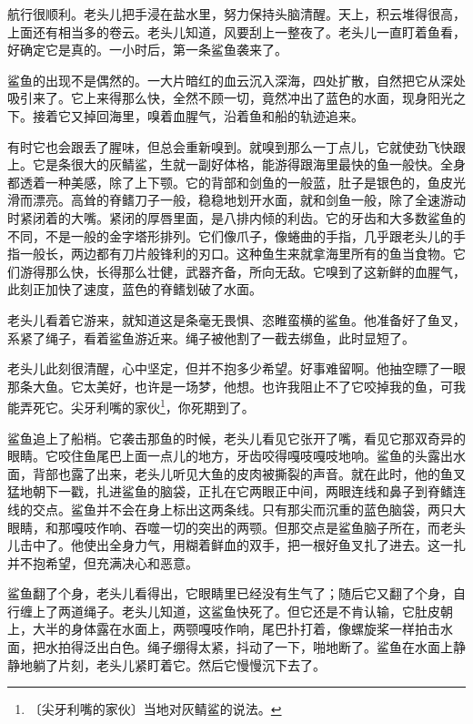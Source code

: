 \documentclass[12pt,UTF-8,openany]{ctexbook}
\begin{document}
\begin{large}
    
    航行很顺利。老头儿把手浸在盐水里，努力保持头脑清醒。天上，积云堆得很高，上面还有相当多的卷云。老头儿知道，风要刮上一整夜了。老头儿一直盯着鱼看，好确定它是真的。一小时后，第一条鲨鱼袭来了。
    
    鲨鱼的出现不是偶然的。一大片暗红的血云沉入深海，四处扩散，自然把它从深处吸引来了。它上来得那么快，全然不顾一切，竟然冲出了蓝色的水面，现身阳光之下。接着它又掉回海里，嗅着血腥气，沿着鱼和船的轨迹追来。
    
    有时它也会跟丢了腥味，但总会重新嗅到。就嗅到那么一丁点儿，它就使劲飞快跟上。它是条很大的灰鲭鲨，生就一副好体格，能游得跟海里最快的鱼一般快。全身都透着一种美感，除了上下颚。它的背部和剑鱼的一般蓝，肚子是银色的，鱼皮光滑而漂亮。高耸的脊鳍刀子一般，稳稳地划开水面，就和剑鱼一般，除了全速游动时紧闭着的大嘴。紧闭的厚唇里面，是八排内倾的利齿。它的牙齿和大多数鲨鱼的不同，不是一般的金字塔形排列。它们像爪子，像蜷曲的手指，几乎跟老头儿的手指一般长，两边都有刀片般锋利的刃口。这种鱼生来就拿海里所有的鱼当食物。它们游得那么快，长得那么壮健，武器齐备，所向无敌。它嗅到了这新鲜的血腥气，此刻正加快了速度，蓝色的脊鳍划破了水面。
    
    老头儿看着它游来，就知道这是条毫无畏惧、恣睢蛮横的鲨鱼。他准备好了鱼叉，系紧了绳子，看着鲨鱼游近来。绳子被他割了一截去绑鱼，此时显短了。
    
    老头儿此刻很清醒，心中坚定，但并不抱多少希望。好事难留啊。他抽空瞟了一眼那条大鱼。它太美好，也许是一场梦，他想。也许我阻止不了它咬掉我的鱼，可我能弄死它。尖牙利嘴的家伙\footnote{〔尖牙利嘴的家伙〕当地对灰鲭鲨的说法。}，你死期到了。
    
    鲨鱼追上了船梢。它袭击那鱼的时候，老头儿看见它张开了嘴，看见它那双奇异的眼睛。它咬住鱼尾巴上面一点儿的地方，牙齿咬得嘎吱嘎吱地响。鲨鱼的头露出水面，背部也露了出来，老头儿听见大鱼的皮肉被撕裂的声音。就在此时，他的鱼叉猛地朝下一戳，扎进鲨鱼的脑袋，正扎在它两眼正中间，两眼连线和鼻子到脊鳍连线的交点。鲨鱼并不会在身上标出这两条线。只有那尖而沉重的蓝色脑袋，两只大眼睛，和那嘎吱作响、吞噬一切的突出的两颚。但那交点是鲨鱼脑子所在，而老头儿击中了。他使出全身力气，用糊着鲜血的双手，把一根好鱼叉扎了进去。这一扎并不抱希望，但充满决心和恶意。
    
    鲨鱼翻了个身，老头儿看得出，它眼睛里已经没有生气了；随后它又翻了个身，自行缠上了两道绳子。老头儿知道，这鲨鱼快死了。但它还是不肯认输，它肚皮朝上，大半的身体露在水面上，两颚嘎吱作响，尾巴扑打着，像螺旋桨一样拍击水面，把水拍得泛出白色。绳子绷得太紧，抖动了一下，啪地断了。鲨鱼在水面上静静地躺了片刻，老头儿紧盯着它。然后它慢慢沉下去了。
    

\end{large}
\end{document}
